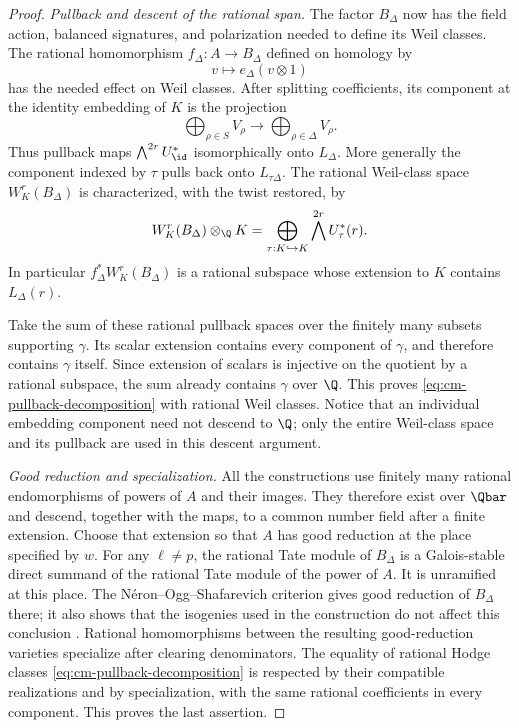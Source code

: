 \begin{proof}
\medskip\noindent
\emph{Pullback and descent of the rational span.}
The factor $B_\Delta$ now has the field action, balanced signatures,
and polarization needed to define its Weil classes.  The rational
homomorphism $f_\Delta\colon A\to B_\Delta$ defined on
homology by
\[
                      v\longmapsto e_\Delta(v\otimes 1)
\]
has the needed effect on Weil classes.  After splitting coefficients,
its component at the identity embedding of $K$ is the projection
\[
                 \bigoplus_{\rho\in S}V_\rho
                    \longrightarrow
                 \bigoplus_{\rho\in\Delta}V_\rho.
\]
Thus pullback maps $\bigwedge^{2r}U_{\id}^*$ isomorphically onto
$L_\Delta$.  More generally the component indexed by $\tau$ pulls back
onto $L_{\tau\Delta}$.  The rational Weil-class space $W_K^r(B_\Delta)$
is characterized, with the twist restored, by
\[
 W_K^r(B_\Delta)\otimes_{\Q}K
       =\bigoplus_{\tau:K\hookrightarrow K}
                         \bigwedge^{2r}U_\tau^*(r).
\]
In particular $f_\Delta^*W_K^r(B_\Delta)$ is a rational subspace whose
extension to $K$ contains $L_\Delta(r)$.

Take the sum of these rational pullback spaces over the finitely many
subsets supporting $\gamma$.  Its scalar extension contains every
component of $\gamma$, and therefore contains $\gamma$ itself.  Since
extension of scalars is injective on the quotient by a rational
subspace, the sum already contains $\gamma$ over $\Q$.  This proves
\eqref{eq:cm-pullback-decomposition} with rational Weil classes.  Notice
that an individual embedding component need not descend to $\Q$;
only the entire Weil-class space and its pullback are used in this
descent argument.

\medskip\noindent
\emph{Good reduction and specialization.}
All the constructions use finitely many rational endomorphisms of
powers of $A$ and their images.  They therefore exist over $\Qbar$ and
descend, together with the maps, to a common number field after a finite
extension.  Choose that extension so that $A$ has good reduction at the
place specified by $w$.  For any $\ell\ne p$, the rational Tate module
of $B_\Delta$ is a Galois-stable direct summand of the rational Tate
module of the power of $A$.  It is unramified at this place.  The
N\'eron--Ogg--Shafarevich criterion gives good reduction of
$B_\Delta$ there; it also shows that the isogenies used in the
construction do not affect this conclusion
\cite[Chapter~IV, Theorem~3.5]{MilneAVNotes}.  Rational homomorphisms between
the resulting good-reduction varieties specialize after clearing
denominators.  The equality of rational Hodge classes
\eqref{eq:cm-pullback-decomposition} is respected by their compatible
realizations and by specialization, with the same rational coefficients
in every component.  This proves the last assertion.
\end{proof}

